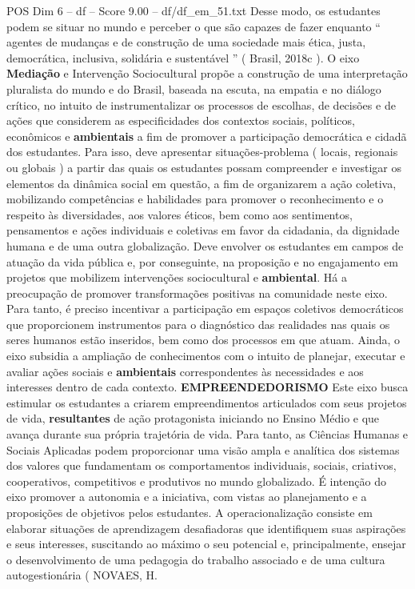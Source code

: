\begin{textsample}{POS Dim 6 – df – Score 9.00 – df/df\_em\_51.txt}
Desse modo, os estudantes podem se situar no mundo e perceber o que são capazes de fazer enquanto “ agentes de mudanças e de construção de uma sociedade mais ética, justa, democrática, inclusiva, solidária e sustentável ” ( Brasil, 2018c ).
O eixo \textbf{Mediação} e Intervenção Sociocultural propõe a construção de uma interpretação pluralista do mundo e do Brasil, baseada na escuta, na empatia e no diálogo crítico, no intuito de instrumentalizar os processos de escolhas, de decisões e de ações que considerem as especificidades dos contextos sociais, políticos, econômicos e \textbf{ambientais} a fim de promover a participação democrática e cidadã dos estudantes.
Para isso, deve apresentar situações-problema ( locais, regionais ou globais ) a partir das quais os estudantes possam compreender e investigar os elementos da dinâmica social em questão, a fim de organizarem a ação coletiva, mobilizando competências e habilidades para promover o reconhecimento e o respeito às diversidades, aos valores éticos, bem como aos sentimentos, pensamentos e ações individuais e coletivas em favor da cidadania, da dignidade humana e de uma outra globalização.
Deve envolver os estudantes em campos de atuação da vida pública e, por conseguinte, na proposição e no engajamento em projetos que mobilizem intervenções sociocultural e \textbf{ambiental}.
Há a preocupação de promover transformações positivas na comunidade neste eixo.
Para tanto, é preciso incentivar a participação em espaços coletivos democráticos que proporcionem instrumentos para o diagnóstico das realidades nas quais os seres humanos estão inseridos, bem como dos processos em que atuam.
Ainda, o eixo subsidia a ampliação de conhecimentos com o intuito de planejar, executar e avaliar ações sociais e \textbf{ambientais} correspondentes às necessidades e aos interesses dentro de cada contexto. \textbf{EMPREENDEDORISMO} Este eixo busca estimular os estudantes a criarem empreendimentos articulados com seus projetos de vida, \textbf{resultantes} de ação protagonista iniciando no Ensino Médio e que avança durante sua própria trajetória de vida.
Para tanto, as Ciências Humanas e Sociais Aplicadas podem proporcionar uma visão ampla e analítica dos sistemas dos valores que fundamentam os comportamentos individuais, sociais, criativos, cooperativos, competitivos e produtivos no mundo globalizado.
É intenção do eixo promover a autonomia e a iniciativa, com vistas ao planejamento e a proposições de objetivos pelos estudantes.
A operacionalização consiste em elaborar situações de aprendizagem desafiadoras que identifiquem suas aspirações e seus interesses, suscitando ao máximo o seu potencial e, principalmente, ensejar o desenvolvimento de uma pedagogia do trabalho associado e de uma cultura autogestionária ( NOVAES, H.

\end{textsample}

